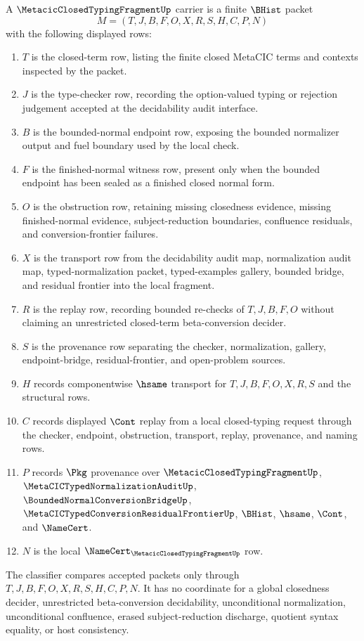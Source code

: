 \begin{definition}
\label{def:metacic-closed-typing-fragment-carrier}
A $\MetacicClosedTypingFragmentUp$ carrier is a finite $\BHist$ packet
$$
M=(T,J,B,F,O,X,R,S,H,C,P,N)
$$
with the following displayed rows:
\begin{enumerate}
\item $T$ is the closed-term row, listing the finite closed MetaCIC terms and contexts inspected by the packet.
\item $J$ is the type-checker row, recording the option-valued typing or rejection judgement accepted at the decidability audit interface.
\item $B$ is the bounded-normal endpoint row, exposing the bounded normalizer output and fuel boundary used by the local check.
\item $F$ is the finished-normal witness row, present only when the bounded endpoint has been sealed as a finished closed normal form.
\item $O$ is the obstruction row, retaining missing closedness evidence, missing finished-normal evidence, subject-reduction boundaries, confluence residuals, and conversion-frontier failures.
\item $X$ is the transport row from the decidability audit map, normalization audit map, typed-normalization packet, typed-examples gallery, bounded bridge, and residual frontier into the local fragment.
\item $R$ is the replay row, recording bounded re-checks of $T,J,B,F,O$ without claiming an unrestricted closed-term beta-conversion decider.
\item $S$ is the provenance row separating the checker, normalization, gallery, endpoint-bridge, residual-frontier, and open-problem sources.
\item $H$ records componentwise $\hsame$ transport for $T,J,B,F,O,X,R,S$ and the structural rows.
\item $C$ records displayed $\Cont$ replay from a local closed-typing request through the checker, endpoint, obstruction, transport, replay, provenance, and naming rows.
\item $P$ records $\Pkg$ provenance over $\MetacicClosedTypingFragmentUp$, $\MetaCICTypedNormalizationAuditUp$, $\BoundedNormalConversionBridgeUp$, $\MetaCICTypedConversionResidualFrontierUp$, $\BHist$, $\hsame$, $\Cont$, and $\NameCert$.
\item $N$ is the local $\NameCert_{\MetacicClosedTypingFragmentUp}$ row.
\end{enumerate}
The classifier compares accepted packets only through $T,J,B,F,O,X,R,S,H,C,P,N$. It has no coordinate for a global closedness decider, unrestricted beta-conversion decidability, unconditional normalization, unconditional confluence, erased subject-reduction discharge, quotient syntax equality, or host consistency.
\end{definition}

